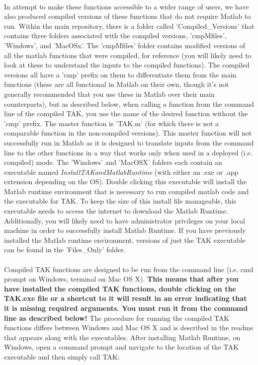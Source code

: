 \paragraph{}In attempt to make these functions accessible to a wider range of users, we have also produced compiled versions of these functions that do not require Matlab to run. Within the main repository, there is a folder called 'Compiled\_Versions' that contains three folders associated with the compiled versions, 'cmpMfiles', 'Windows', and 'MacOSx'. The 'cmpMfiles' folder contains modified versions of all the matlab functions that were compiled, for reference (you will likely need to look at these to understand the inputs to the compiled functions). The compiled versions all have a 'cmp' prefix on them to differentiate them from the main functions (these are all functional in Matlab on their own, though it's not generally recommended that you use these in Matlab over their main counterparts), but as described below, when calling a function from the command line of the compiled TAK, you use the name of the desired function without the 'cmp' prefix. The master function is 'TAK.m' (for which there is not a comparable function in the non-compiled versions). This master function will not successfully run in Matlab as it is designed to translate inputs from the command line to the other functions in a way that works only when used in a deployed (i.e. compiled) mode. The 'Windows' and 'MacOSX' folders each contain an executable named \textit{InstallTAKandMatlabRuntime} (with either an .exe or .app extension depending on the OS). Double clicking this executable will install the Matlab runtime environment that is necessary to run compiled matlab code and the executable for TAK. To keep the size of this install file manageable, this executable needs to access the internet to download the Matlab Runtime. Additionally, you will likely need to have administrator privileges on your local machine in order to successfully install Matlab Runtime. If you have previously installed the Matlab runtime environment, versions of just the TAK executable can be found in the 'Files\_Only' folder. 

\paragraph{}Compiled TAK functions are designed to be run from the command line (i.e. cmd prompt on Windows, terminal on Mac OS X). \textbf{This means that after you have installed the compiled TAK functions, double clicking on the TAK.exe file or a shortcut to it will result in an error indicating that it is missing required arguments. You must run it from the command line as described below!} The procedure for running the compiled TAK functions differs between Windows and Mac OS X and is described in the readme that appears along with the executables. After installing Matlab Runtime, on Windows, open a command prompt and navigate to the location of the TAK executable and then simply call TAK:

